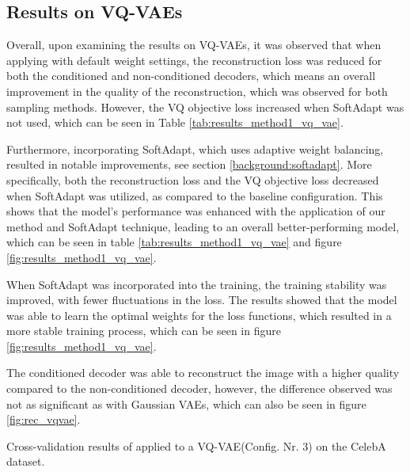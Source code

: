 \subsection{Results on VQ-VAEs}

Overall, upon examining the results on VQ-VAEs, it was observed that when applying  with default weight settings, the reconstruction loss was reduced for both the conditioned and non-conditioned decoders, which means an overall improvement in the quality of the reconstruction, which was observed for both sampling methods. However, the VQ objective loss increased when SoftAdapt was not used, which can be seen in Table \ref{tab:results_method1_vq_vae}.

Furthermore, incorporating SoftAdapt, which uses adaptive weight balancing, resulted in notable improvements, see section \ref{background:softadapt}. More specifically, both the reconstruction loss and the VQ objective loss decreased when SoftAdapt was utilized, as compared to the baseline configuration. This shows that the model's performance was enhanced with the application of our method and SoftAdapt technique, leading to an overall better-performing model, which can be seen in table \ref{tab:results_method1_vq_vae} and figure \ref{fig:results_method1_vq_vae}. 

When SoftAdapt was incorporated into the training, the training stability was improved, with fewer fluctuations in the loss. The results showed that the model was able to learn the optimal weights for the loss functions, which resulted in a more stable training process, which can be seen in figure \ref{fig:results_method1_vq_vae}.

The conditioned decoder was able to reconstruct the image with a higher quality compared to the non-conditioned decoder, however, the difference observed was not as significant as with Gaussian VAEs, which can also be seen in figure \ref{fig:rec_vqvae}. 


\begin{table}[H]
    \centering
    
    \caption{Cross-validation results of  applied to a VQ-VAE(Config. Nr. 3) on the CelebA dataset.}
    \label{tab:results_method1_vq_vae}
\end{table}

